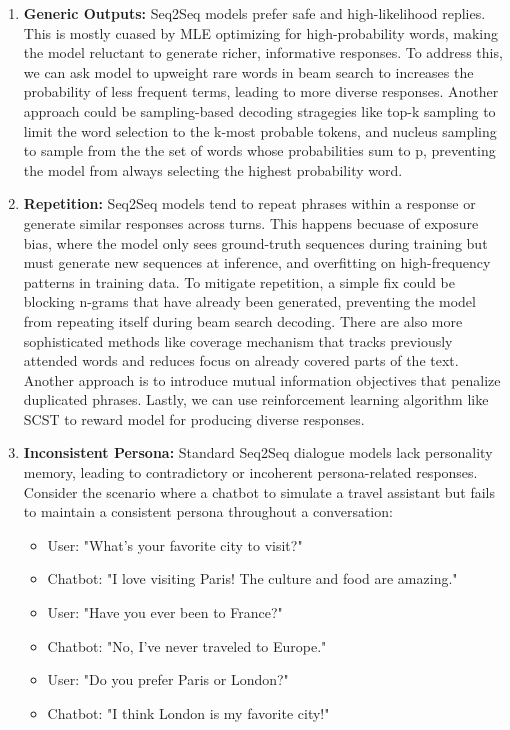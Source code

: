 \documentclass[10pt]{article}
\begin{document}
\begin{description}
\begin{enumerate}
    \item \textbf{Generic Outputs:} Seq2Seq models prefer safe and high-likelihood replies. This is mostly cuased by MLE optimizing for high-probability words, 
    making the model reluctant to generate richer, informative responses. To address this, we can ask model to upweight rare words in beam search to increases 
    the probability of less frequent terms, leading to more diverse responses. Another approach could be sampling-based decoding stragegies like top-k sampling to
    limit the word selection to the k-most probable tokens, and nucleus sampling to sample from the the set of words whose probabilities sum to p, 
    preventing the model from always selecting the highest probability word.

    \item \textbf{Repetition:} Seq2Seq models tend to repeat phrases within a response or generate similar responses across turns. This happens becuase of exposure bias, 
    where the model only sees ground-truth sequences during training but must generate new sequences at inference, and overfitting on high-frequency patterns in training data.
    To mitigate repetition, a simple fix could be blocking n-grams that have already been generated, preventing the model from repeating itself during beam search decoding.
    There are also more sophisticated methods like coverage mechanism that tracks previously attended words and reduces focus on already covered parts of the text. 
    Another approach is to introduce mutual information objectives that penalize duplicated phrases. Lastly, we can use reinforcement learning algorithm like SCST to 
    reward model for producing diverse responses.
    
    \item \textbf{Inconsistent Persona:} Standard Seq2Seq dialogue models lack personality memory, leading to contradictory or incoherent persona-related responses.
    Consider the scenario where a chatbot to simulate a travel assistant but fails to maintain a consistent persona throughout a conversation:

    \begin{itemize}
        \item User: "What’s your favorite city to visit?"
        \item Chatbot: "I love visiting Paris! The culture and food are amazing."
        \item User: "Have you ever been to France?"
        \item Chatbot: "No, I’ve never traveled to Europe."
        \item User: "Do you prefer Paris or London?"
        \item Chatbot: "I think London is my favorite city!"
    \end{itemize}


\end{enumerate}
\end{description}
\end{document}
